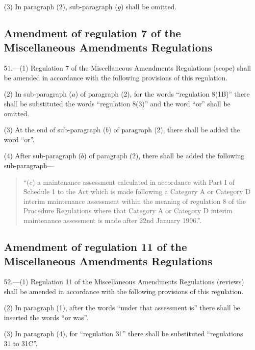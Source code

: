 \documentclass[12pt,a4paper]{article}
\begin{document}
(3) In paragraph (2), sub-paragraph ($g$) shall be omitted.

{

\subsection[51. Amendment of regulation 7 of the Miscellaneous Amendments Regulations]{\sloppy Amendment of regulation 7 of the Miscellaneous Amendments Regulations}

}

51.—(1) Regulation 7 of the Miscellaneous Amendments Regulations (scope) shall be amended in accordance with the following provisions of this regulation.

(2) In sub-paragraph ($a$) of paragraph (2), for the words “regulation 8(1B)” there shall be substituted the words “regulation 8(3)” and the word “or” shall be omitted.

(3) At the end of sub-paragraph ($b$) of paragraph (2), there shall be added the word “or”.

(4) After sub-paragraph ($b$) of paragraph (2), there shall be added the following sub-paragraph—
\begin{quotation}
“($c$) a maintenance assessment calculated in accordance with Part I of Schedule 1 to the Act which is made following a Category A or Category D interim maintenance assessment within the meaning of regulation 8 of the Procedure Regulations where that Category A or Category D interim maintenance assessment is made after 22nd January 1996.”.
\end{quotation}

{

\subsection[52. Amendment of regulation 11 of the Miscellaneous Amendments Regulations]{\sloppy Amendment of regulation 11 of the Miscellaneous Amendments Regulations}

}

52.—(1) Regulation 11 of the Miscellaneous Amendments Regulations (reviews) shall be amended in accordance with the following provisions of this regulation.

(2) In paragraph (1), after the words “under that assessment is” there shall be inserted the words “or was”.

(3) In paragraph (4), for “regulation 31” there shall be substituted “regulations 31 to 31C”.
\end{document}
